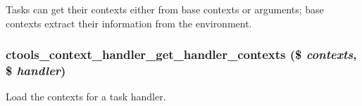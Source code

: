 Tasks can get their contexts either from base contexts or arguments; base contexts extract their information from the environment. \hypertarget{context-task-handler_8inc_a7d594479dfb21d64f829015a9a58c5bf}{
\subsubsection[{ctools\_\-context\_\-handler\_\-get\_\-handler\_\-contexts}]{\setlength{\rightskip}{0pt plus 5cm}ctools\_\-context\_\-handler\_\-get\_\-handler\_\-contexts (\$ {\em contexts}, \/  \$ {\em handler})}}
\label{context-task-handler_8inc_a7d594479dfb21d64f829015a9a58c5bf}
Load the contexts for a task handler.

